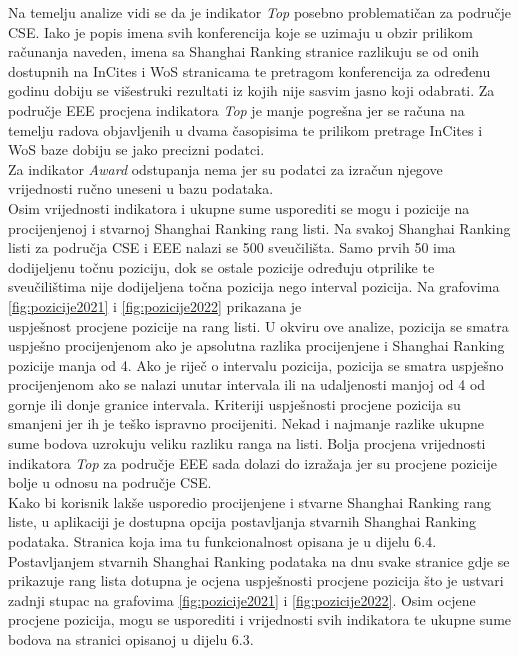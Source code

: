 \documentclass[times, utf8, zavrsni]{fer}
\begin{document}
Na temelju analize vidi se da je indikator \emph{Top} posebno problematičan za područje CSE. Iako je popis imena svih konferencija koje se uzimaju u obzir
prilikom računanja naveden, imena sa Shanghai Ranking stranice razlikuju se od onih dostupnih 
na InCites i WoS stranicama te pretragom konferencija za određenu godinu dobiju se višestruki rezultati iz kojih nije sasvim jasno koji odabrati. Za područje EEE procjena 
indikatora \emph{Top} je manje pogrešna jer se računa na temelju radova objavljenih u dvama časopisima te prilikom pretrage InCites i WoS baze dobiju se jako precizni podatci.
\\Za indikator \emph{Award} odstupanja nema jer su podatci za izračun njegove vrijednosti ručno uneseni u bazu podataka.
\\Osim vrijednosti indikatora i ukupne sume  usporediti se mogu i pozicije na procijenjenoj i stvarnoj Shanghai Ranking rang listi.
Na svakoj Shanghai Ranking listi za područja CSE i EEE nalazi se 500 sveučilišta. Samo prvih 50 ima dodijeljenu točnu poziciju, dok se ostale pozicije određuju
otprilike te sveučilištima nije dodijeljena točna pozicija nego interval pozicija. Na grafovima \ref{fig:pozicije2021} i \ref{fig:pozicije2022}
prikazana je \\uspješnost procjene pozicije na rang listi. U okviru ove analize, 
pozicija se smatra uspješno procijenjenom ako je apsolutna razlika procijenjene i Shanghai Ranking pozicije manja od 4. Ako je riječ o intervalu pozicija, 
pozicija se smatra uspješno procijenjenom ako se nalazi unutar intervala ili na udaljenosti manjoj od 4 od gornje ili donje granice intervala. Kriteriji uspješnosti 
procjene pozicija su smanjeni jer ih je teško ispravno procijeniti. Nekad i najmanje razlike ukupne sume bodova uzrokuju veliku razliku ranga na listi. 
Bolja procjena vrijednosti indikatora \emph{Top} za područje EEE sada dolazi do izražaja jer su procjene pozicije bolje u odnosu na područje CSE.
\\Kako bi korisnik lakše usporedio procijenjene i stvarne Shanghai Ranking rang liste, u aplikaciji je dostupna opcija postavljanja  
stvarnih Shanghai Ranking podataka. Stranica koja ima tu funkcionalnost opisana je u dijelu 6.4. Postavljanjem stvarnih Shanghai Ranking podataka na dnu svake stranice gdje se prikazuje
rang lista dotupna je ocjena uspješnosti procjene pozicija što je ustvari zadnji stupac na grafovima \ref{fig:pozicije2021} i \ref{fig:pozicije2022}. Osim ocjene procjene pozicija, 
mogu se usporediti i vrijednosti svih indikatora te ukupne sume bodova na stranici opisanoj u dijelu 6.3.
\end{document}
